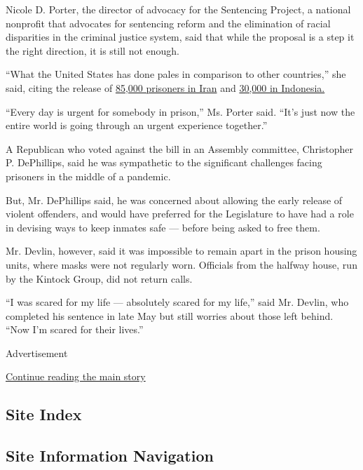 Nicole D. Porter, the director of advocacy for the Sentencing Project, a
national nonprofit that advocates for sentencing reform and the
elimination of racial disparities in the criminal justice system, said
that while the proposal is a step it the right direction, it is still
not enough.

``What the United States has done pales in comparison to other
countries,'' she said, citing the release of
\href{https://www.nytimes.com/2020/04/26/world/americas/coronavirus-brazil-prisons.html}{85,000
prisoners in Iran} and
\href{https://www.reuters.com/article/us-health-coronavirus-indonesia-prisons/indonesia-to-release-30000-prisoners-early-amid-virus-concerns-idUSKBN21I11Z}{30,000
in Indonesia.}

``Every day is urgent for somebody in prison,'' Ms. Porter said. ``It's
just now the entire world is going through an urgent experience
together.''

A Republican who voted against the bill in an Assembly committee,
Christopher P. DePhillips, said he was sympathetic to the significant
challenges facing prisoners in the middle of a pandemic.

But, Mr. DePhillips said, he was concerned about allowing the early
release of violent offenders, and would have preferred for the
Legislature to have had a role in devising ways to keep inmates safe ---
before being asked to free them.

Mr. Devlin, however, said it was impossible to remain apart in the
prison housing units, where masks were not regularly worn. Officials
from the halfway house, run by the Kintock Group, did not return calls.

``I was scared for my life --- absolutely scared for my life,'' said Mr.
Devlin, who completed his sentence in late May but still worries about
those left behind. ``Now I'm scared for their lives.''

Advertisement

\protect\hyperlink{after-bottom}{Continue reading the main story}

\hypertarget{site-index}{%
\subsection{Site Index}\label{site-index}}

\hypertarget{site-information-navigation}{%
\subsection{Site Information
Navigation}\label{site-information-navigation}}

